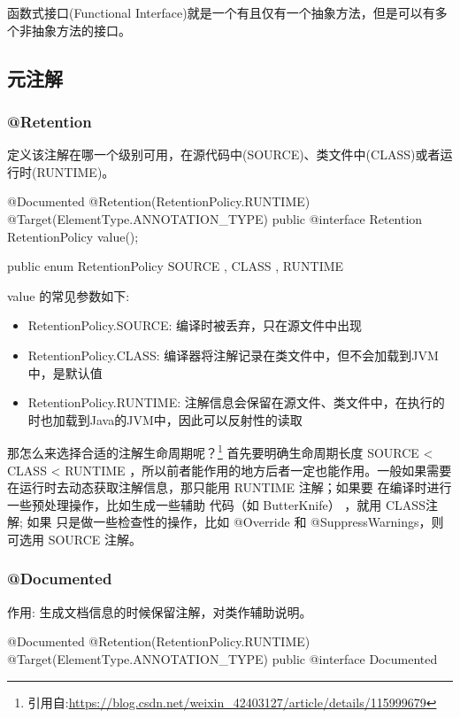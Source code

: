 函数式接口(Functional Interface)就是一个有且仅有一个抽象方法，但是可以有多个非抽象方法的接口。

\subsection{元注解}

\subsubsection*{@Retention}

定义该注解在哪一个级别可用，在源代码中(SOURCE)、类文件中(CLASS)或者运行时(RUNTIME)。

\begin{Java}
@Documented
@Retention(RetentionPolicy.RUNTIME)
@Target(ElementType.ANNOTATION_TYPE)
public @interface Retention {
    RetentionPolicy value();
}

public enum RetentionPolicy {
    SOURCE , CLASS , RUNTIME
}
\end{Java}

value 的常见参数如下:
\begin{itemize}
    \item RetentionPolicy.SOURCE: 编译时被丢弃，只在源文件中出现
    \item RetentionPolicy.CLASS: 编译器将注解记录在类文件中，但不会加载到JVM中，是默认值
    \item RetentionPolicy.RUNTIME: 注解信息会保留在源文件、类文件中，在执行的时也加载到Java的JVM中，因此可以反射性的读取
\end{itemize}

那怎么来选择合适的注解生命周期呢？\footnote{引用自:\url{https://blog.csdn.net/weixin_42403127/article/details/115999679}}
首先要明确生命周期长度 SOURCE < CLASS < RUNTIME ，所以前者能作用的地方后者一定也能作用。一般如果需要 
在运行时去动态获取注解信息，那只能用 RUNTIME 注解；如果要 在编译时进行一些预处理操作，比如生成一些辅助
代码（如 ButterKnife） ，就用 CLASS注解; 如果 只是做一些检查性的操作，比如 @Override 和
 @SuppressWarnings，则 可选用 SOURCE 注解。

\subsubsection*{@Documented}

作用: 生成文档信息的时候保留注解，对类作辅助说明。

\begin{Java}
@Documented
@Retention(RetentionPolicy.RUNTIME)
@Target(ElementType.ANNOTATION_TYPE)
public @interface Documented {}
\end{Java}

